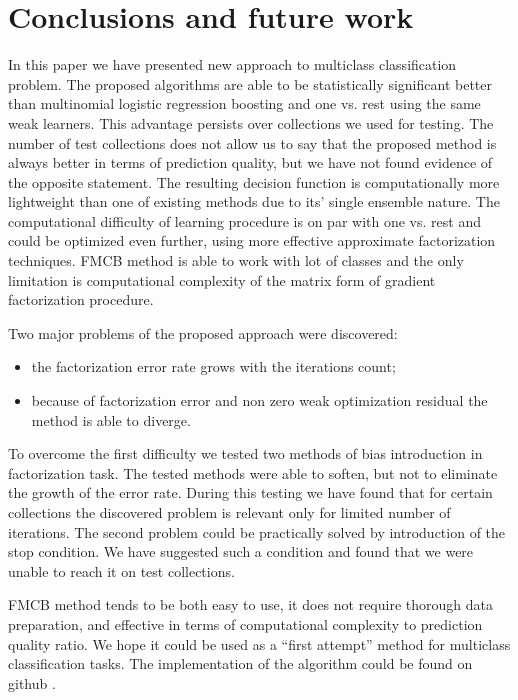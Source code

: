 \documentclass{article}
\begin{document}
\section{Conclusions and future work}
In this paper we have presented new approach to multiclass classification problem. The proposed algorithms are able to be statistically significant better than multinomial logistic regression boosting and one vs. rest using the same weak learners. This advantage persists over collections we used for testing. The number of test collections does not allow us to say that the proposed method is always better in terms of prediction quality, but we have not found evidence of the opposite statement. The resulting decision function is computationally more lightweight than one of existing methods due to its' single ensemble nature. The computational difficulty of learning procedure is on par with one vs. rest and could be optimized even further, using more effective approximate factorization techniques. FMCB method is able to work with lot of classes and the only limitation is computational complexity of the matrix form of gradient factorization procedure.

Two major problems of the proposed approach were discovered:
\begin{itemize}
	\item the factorization error rate grows with the iterations count;
	\item because of factorization error and non zero weak optimization residual the method is able to diverge.
\end{itemize}
To overcome the first difficulty we tested two methods of bias introduction in factorization task. The tested methods were able to soften, but not to eliminate the growth of the error rate. During this testing we have found that for certain collections the discovered problem is relevant only for limited number of iterations. The second problem could be practically solved by introduction of the stop condition. We have suggested such a condition and found that we were unable to reach it on test collections.

FMCB method tends to be both easy to use, it does not require thorough data preparation, and effective in terms of computational complexity to prediction quality ratio. We hope it could be used as a ``first attempt'' method for multiclass classification tasks. The implementation of the algorithm could be found on github \cite{github}.
\end{document}

